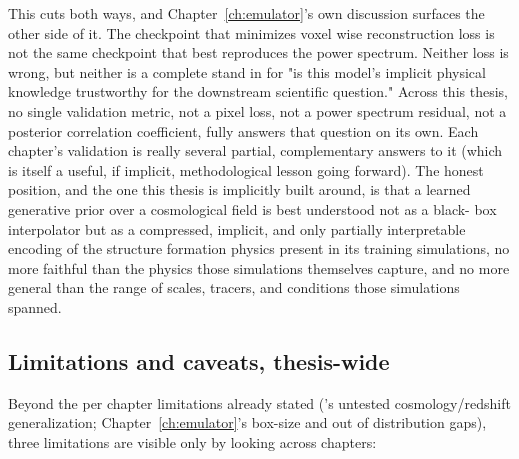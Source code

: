 This cuts both ways, and Chapter~\ref{ch:emulator}'s own discussion surfaces the other side of it. The checkpoint that minimizes voxel wise reconstruction loss is not the same checkpoint that best reproduces the power spectrum. Neither loss is wrong, but neither is a complete stand in for "is this model's implicit physical knowledge trustworthy for the downstream scientific question." Across this thesis, no single validation metric, not a pixel loss, not a power spectrum residual, not a posterior correlation coefficient, fully answers that question on its own. Each chapter's validation is really several partial, complementary answers to it (which is itself a useful, if implicit, methodological lesson going forward). The honest position, and the one this thesis is implicitly built around, is that a learned generative prior over a cosmological field is best understood not as a black-
 box interpolator but as a compressed, implicit, and only partially interpretable encoding of the structure formation physics present in its training simulations, no more faithful than the physics those simulations themselves capture, and no more general than the range of scales, tracers, and conditions those simulations spanned.

\subsection{Limitations and caveats, thesis-wide}
\label{sec:conclusion_disc_limits}

Beyond the per chapter limitations already stated (\LODI's untested cosmology/redshift generalization; Chapter~\ref{ch:emulator}'s box-size and out of distribution gaps), three limitations are visible only by looking across chapters:

